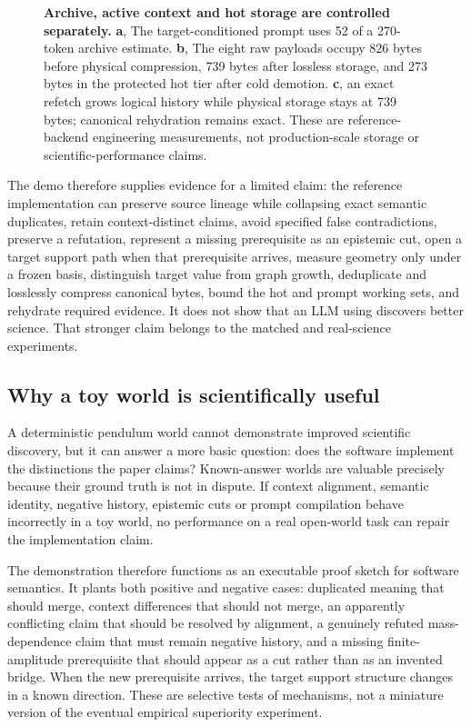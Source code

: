 \begin{figure}[t]
\centering

\caption{\textbf{Archive, active context and hot storage are controlled separately.} \textbf{a}, The target-conditioned prompt uses 52 of a 270-token archive estimate. \textbf{b}, The eight raw payloads occupy 826 bytes before physical compression, 739 bytes after lossless storage, and 273 bytes in the protected hot tier after cold demotion. \textbf{c}, an exact refetch grows logical history while physical storage stays at 739 bytes; canonical rehydration remains exact. These are reference-backend engineering measurements, not production-scale storage or scientific-performance claims.}
\label{fig:democontext}
\end{figure}

The demo therefore supplies evidence for a limited claim: the reference implementation can preserve source lineage while collapsing exact semantic duplicates, retain context-distinct claims, avoid specified false contradictions, preserve a refutation, represent a missing prerequisite as an epistemic cut, open a target support path when that prerequisite arrives, measure geometry only under a frozen basis, distinguish target value from graph growth, deduplicate and losslessly compress canonical bytes, bound the hot and prompt working sets, and rehydrate required evidence. It does not show that an LLM using \RAKL{} discovers better science. That stronger claim belongs to the matched and real-science experiments.

\subsection{Why a toy world is scientifically useful}

A deterministic pendulum world cannot demonstrate improved scientific discovery, but it can answer a more basic question: does the software implement the distinctions the paper claims? Known-answer worlds are valuable precisely because their ground truth is not in dispute. If context alignment, semantic identity, negative history, epistemic cuts or prompt compilation behave incorrectly in a toy world, no performance on a real open-world task can repair the implementation claim.

The demonstration therefore functions as an executable proof sketch for software semantics. It plants both positive and negative cases: duplicated meaning that should merge, context differences that should not merge, an apparently conflicting claim that should be resolved by alignment, a genuinely refuted mass-dependence claim that must remain negative history, and a missing finite-amplitude prerequisite that should appear as a cut rather than as an invented bridge. When the new prerequisite arrives, the target support structure changes in a known direction. These are selective tests of mechanisms, not a miniature version of the eventual empirical superiority experiment.

